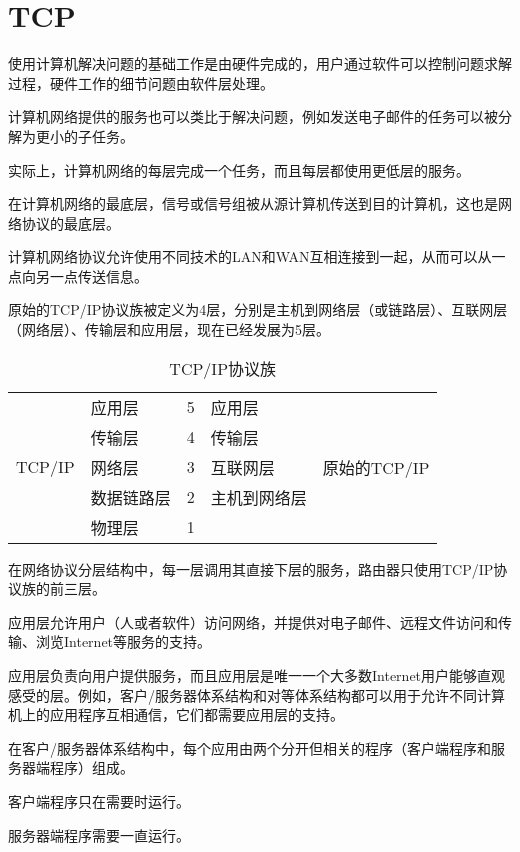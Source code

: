 \section{TCP}


使用计算机解决问题的基础工作是由硬件完成的，用户通过软件可以控制问题求解过程，硬件工作的细节问题由软件层处理。

计算机网络提供的服务也可以类比于解决问题，例如发送电子邮件的任务可以被分解为更小的子任务。

实际上，计算机网络的每层完成一个任务，而且每层都使用更低层的服务。

在计算机网络的最底层，信号或信号组被从源计算机传送到目的计算机，这也是网络协议的最底层。

计算机网络协议允许使用不同技术的LAN和WAN互相连接到一起，从而可以从一点向另一点传送信息。

原始的TCP/IP协议族被定义为4层，分别是主机到网络层（或链路层）、互联网层（网络层）、传输层和应用层，现在已经发展为5层。

\begin{table}[htbp]
\centering
\caption{TCP/IP协议族}
\begin{tabular}{|l|l|l|l|l|}
\hline
	& 应用层 & 5 & 应用层 & \\ \cline{2-4}
	&传输层 & 4 & 传输层 & \\ \cline{2-4}
TCP/IP&网络层 & 3 & 互联网层 & 原始的TCP/IP\\ \cline{2-4}
	&数据链路层 & 2 & 主机到网络层 & \\ \cline{2-4}
	&物理层 & 1 & & \\
\hline
\end{tabular}
\end{table}

在网络协议分层结构中，每一层调用其直接下层的服务，路由器只使用TCP/IP协议族的前三层。

应用层允许用户（人或者软件）访问网络，并提供对电子邮件、远程文件访问和传输、浏览Internet等服务的支持。

应用层负责向用户提供服务，而且应用层是唯一一个大多数Internet用户能够直观感受的层。例如，客户/服务器体系结构和对等体系结构都可以用于允许不同计算机上的应用程序互相通信，它们都需要应用层的支持。

在客户/服务器体系结构中，每个应用由两个分开但相关的程序（客户端程序和服务器端程序）组成。

\begin{compactitem}
\item 客户端程序只在需要时运行。
\item 服务器端程序需要一直运行。
\end{compactitem}

